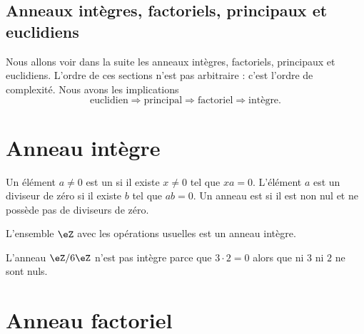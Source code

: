 \subsection{Anneaux intègres, factoriels, principaux et euclidiens}

Nous allons voir dans la suite les anneaux intègres, factoriels, principaux et euclidiens. L'ordre de ces sections n'est pas arbitraire : c'est l'ordre de complexité. Nous avons les implications
\begin{equation}
    \text{euclidien}\Rightarrow\text{principal}\Rightarrow\text{factoriel}\Rightarrow\text{intègre}.
\end{equation}

\section{Anneau intègre}

Un élément \( a\neq 0\) est un  si il existe \( x\neq 0\) tel que $xa=0$. L'élément \( a\) est un diviseur de zéro  si il existe \( b\) tel que \( ab=0\). Un anneau est  si il est non nul et ne possède pas de diviseurs de zéro.

\begin{example}
    L'ensemble \( \eZ\) avec les opérations usuelles est un anneau intègre.
\end{example}

\begin{example}
    L'anneau \( \eZ/6\eZ\) n'est pas intègre parce que \( 3\cdot 2=0\) alors que ni \( 3\) ni \( 2\) ne sont nuls.
\end{example}

\section{Anneau factoriel}


